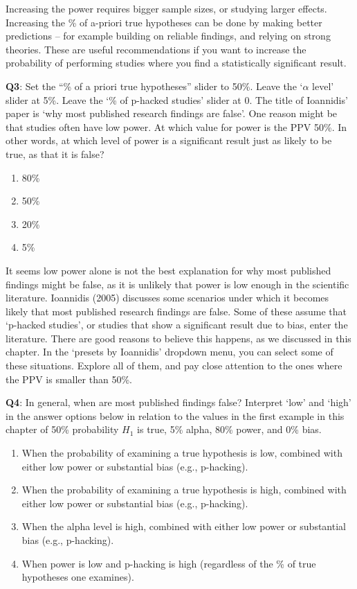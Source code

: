 \documentclass[
  oneside]{book}
\providecommand{\tightlist}{%
  \setlength{\itemsep}{0pt}\setlength{\parskip}{0pt}}
\begin{document}
Increasing the power requires bigger sample sizes, or studying larger effects. Increasing the \% of a-priori true hypotheses can be done by making better predictions -- for example building on reliable findings, and relying on strong theories. These are useful recommendations if you want to increase the probability of performing studies where you find a statistically significant result.

\textbf{Q3}: Set the ``\% of a priori true hypotheses'' slider to 50\%. Leave the `\(\alpha\) level' slider at 5\%. Leave the `\% of p-hacked studies' slider at 0. The title of Ioannidis' paper is `why most published research findings are false'. One reason might be that studies often have low power. At which value for power is the PPV 50\%. In other words, at which level of power is a significant result just as likely to be true, as that it is false?

\begin{enumerate}
\def\labelenumi{\Alph{enumi})}
\tightlist
\item
  80\%
\item
  50\%
\item
  20\%
\item
  5\%
\end{enumerate}

It seems low power alone is not the best explanation for why most published findings might be false, as it is unlikely that power is low enough in the scientific literature. Ioannidis (2005) discusses some scenarios under which it becomes likely that most published research findings are false. Some of these assume that `p-hacked studies', or studies that show a significant result due to bias, enter the literature. There are good reasons to believe this happens, as we discussed in this chapter. In the `presets by Ioannidis' dropdown menu, you can select some of these situations. Explore all of them, and pay close attention to the ones where the PPV is smaller than 50\%.

\textbf{Q4}: In general, when are most published findings false? Interpret `low' and `high' in the answer options below in relation to the values in the first example in this chapter of 50\% probability \(H_1\) is true, 5\% alpha, 80\% power,
and 0\% bias.

\begin{enumerate}
\def\labelenumi{\Alph{enumi})}
\tightlist
\item
  When the probability of examining a true hypothesis is low, combined with either low power or substantial bias (e.g., p-hacking).
\item
  When the probability of examining a true hypothesis is high, combined with either low power or substantial bias (e.g., p-hacking).
\item
  When the alpha level is high, combined with either low power or substantial bias (e.g., p-hacking).
\item
  When power is low and p-hacking is high (regardless of the \% of true hypotheses one examines).
\end{enumerate}
\end{document}
